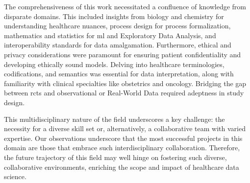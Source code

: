 The comprehensiveness of this work necessitated a confluence of knowledge from disparate domains. This included insights from biology and chemistry for understanding healthcare nuances, process design for process formalization, mathematics and statistics for \ac{ml} and Exploratory Data Analysis, and interoperability standards for data amalgamation. Furthermore, ethical and privacy considerations were paramount for ensuring patient confidentiality and developing ethically sound models. Delving into healthcare terminologies, codifications, and semantics was essential for data interpretation, along with familiarity with clinical specialties like obstetrics and oncology. Bridging the gap between \acp{rct} and observational or Real-World Data required adeptness in study design.

This multidisciplinary nature of the field underscores a key challenge: the necessity for a diverse skill set or, alternatively, a collaborative team with varied expertise. Our observations underscore that the most successful projects in this domain are those that embrace such interdisciplinary collaboration. Therefore, the future trajectory of this field may well hinge on fostering such diverse, collaborative environments, enriching the scope and impact of healthcare data science.
